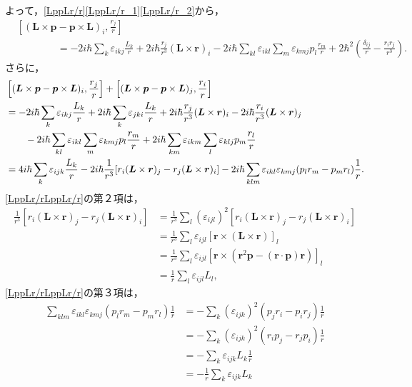 よって，\eqref{LppLr/r}\eqref{LppLr/r_1}\eqref{LppLr/r_2}から，
\begin{align*}
  & \left[(\boldsymbol{L}\times\boldsymbol{p} - \boldsymbol{p}\times\boldsymbol{L})_i,\frac{r_j}{r}\right] \\
  & \qquad \qquad = - 2i\hbar\sum_{k}\varepsilon_{ikj}\frac{L_k}{r} + 2i\hbar\frac{r_j}{r^3}(\boldsymbol{L}\times\boldsymbol{r})_i - 2i\hbar\sum_{kl}\varepsilon_{ikl}\sum_m\varepsilon_{kmj}p_l\frac{r_m}{r} + 2\hbar^2\left(\frac{\delta_{ij}}{r} - \frac{r_ir_j}{r^3}\right).
\end{align*}
さらに，
\begin{align}
  & \left[(\boldsymbol{L}\times\boldsymbol{p} - \boldsymbol{p}\times\boldsymbol{L})_i,\frac{r_j}{r}\right] + \left[(\boldsymbol{L}\times\boldsymbol{p} - \boldsymbol{p}\times\boldsymbol{L})_j,\frac{r_i}{r}\right]\notag\\
  & = - 2i\hbar\sum_k\varepsilon_{ikj}\frac{L_k}{r} + 2i\hbar\sum_k\varepsilon_{jki}\frac{L_k}{r} + 2i\hbar\frac{r_j}{r^3}(\boldsymbol{L}\times\boldsymbol{r})_i - 2i\hbar\frac{r_i}{r^3}(\boldsymbol{L}\times\boldsymbol{r})_j\notag\\
  & \qquad - 2i\hbar\sum_{kl}\varepsilon_{ikl}\sum_m\varepsilon_{kmj}p_l\frac{r_m}{r} + 2i\hbar\sum_{km}\varepsilon_{ikm}\sum_l\varepsilon_{klj}p_m\frac{r_l}{r}\notag\\
  & = 4i\hbar\sum_k\varepsilon_{ijk}\frac{L_k}{r} - 2i\hbar\frac{1}{r^3}[r_i(\boldsymbol{L}\times\boldsymbol{r})_j - r_j(\boldsymbol{L}\times\boldsymbol{r})_i] - 2i\hbar\sum_{klm}\varepsilon_{ikl}\varepsilon_{kmj}(p_lr_m - p_mr_l)\frac{1}{r}.\label{LppLr/rLppLr/r}
\end{align}
\eqref{LppLr/rLppLr/r}の第２項は，
\begin{align*}
  \frac{1}{r^3}[r_i(\boldsymbol{L}\times\boldsymbol{r})_j - r_j(\boldsymbol{L}\times\boldsymbol{r})_i]
  & = \frac{1}{r^3}\sum_l(\varepsilon_{ijl})^2[r_i(\boldsymbol{L}\times\boldsymbol{r})_j - r_j(\boldsymbol{L}\times\boldsymbol{r})_i]\\
  & = \frac{1}{r^3}\sum_l\varepsilon_{ijl}[\boldsymbol{r}\times(\boldsymbol{L}\times\boldsymbol{r})]_l\\
  & = \frac{1}{r^3}\sum_l\varepsilon_{ijl}[\boldsymbol{r}\times(\boldsymbol{r}^2\boldsymbol{p} - (\boldsymbol{r}\cdot\boldsymbol{p})\boldsymbol{r})]_l\\
  & = \frac{1}{r}\sum_l\varepsilon_{ijl}L_l,
\end{align*}
\eqref{LppLr/rLppLr/r}の第３項は，
\begin{align*}
  \sum_{klm}\varepsilon_{ikl}\varepsilon_{kmj}(p_lr_m - p_mr_l)\frac{1}{r}
  & = - \sum_k(\varepsilon_{ijk})^2(p_jr_i - p_ir_j)\frac{1}{r}\\
  & = - \sum_k(\varepsilon_{ijk})^2(r_ip_j - r_jp_i)\frac{1}{r}\\
  & = - \sum_k\varepsilon_{ijk}L_k\frac{1}{r}\\
  & = - \frac{1}{r}\sum_k\varepsilon_{ijk}L_k
\end{align*}
